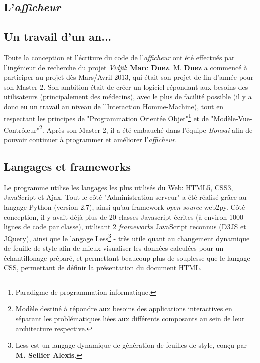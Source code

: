 \documentclass[pdftex,12pt,a4paper]{report}
\begin{document}
\begin{spacing}{1.2}
\section{L'\textit{afficheur}}

\subsection{Un travail d'un an...}
Toute la conception et l'écriture du code de l'\textit{afficheur} ont été effectués par l'ingénieur de recherche du projet \textit{Vidjil}: \textbf{Marc Duez}.
\newline
M. \textbf{Duez} a commencé à participer au projet dès Mars/Avril 2013, qui était son projet de fin d'année pour son Master 2.
\newline
Son ambition était de créer un logiciel répondant aux besoins des utilisateurs (principalement des médecins), avec le plus de facilité possible (il y a donc eu un travail au niveau de l'Interaction Homme-Machine), tout en respectant les principes de "Programmation Orientée Objet"\footnote{Paradigme de programmation informatique.} et de "Modèle-Vue-Contrôleur"\footnote{Modèle destiné à répondre aux besoins des applications interactives en séparant les problématiques liées aux différents composants au sein de leur architecture respective.}.
\newline
Après son Master 2, il a été embauché dans l'équipe \textit{Bonsai} afin de pouvoir continuer à programmer et améliorer l'\textit{afficheur}.

\subsection{Langages et frameworks}
Le programme utilise les langages les plus utilisés du Web: HTML5, CSS3, JavaScript et Ajax.
\newline
Tout le côté "Administration serveur" a été réalisé grâce au langage Python (version 2.7), ainsi qu'au framework \textit{open source} web2py.
\newline
Côté conception, il y avait déjà plus de 20 classes Javascript écrites (à environ 1000 lignes de code par classe), utilisant 2 \textit{frameworks} JavaScript reconnus (D3JS et JQuery), ainsi que le langage Less\footnote{Less est un langage dynamique de génération de feuilles de style, conçu par \textbf{M. Sellier Alexis}.} - très utile quant au changement dynamique de feuille de style afin de mieux visualiser les données calculées pour un échantillonage préparé, et permettant beaucoup plus de souplesse que le langage CSS, permettant de définir la présentation du document HTML.


\end{spacing}
\end{document}
